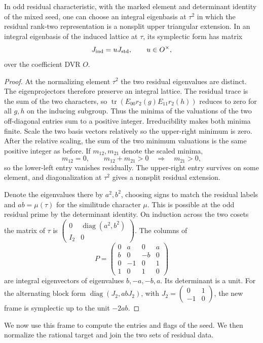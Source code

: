 \begin{lemma}
\label{lem:rank-four-seed-diagonalization}
In odd residual characteristic, with the marked element and
determinant identity of the mixed seed, one can choose an
integral eigenbasis at \(\tau^2\) in which the residual
rank-two representation is a nonsplit upper triangular
extension. In an integral eigenbasis of the induced lattice at \(\tau\), its symplectic form has matrix 
\[
 J_{\rm ind}=uJ_{\rm std},\qquad u\in O^\times,
\]
 over the coefficient DVR \(O\).
\end{lemma}

\begin{proof}
At the normalizing element
\(\tau^2\) the two residual eigenvalues are distinct.
The eigenprojectors therefore preserve an integral lattice.
The residual trace is the sum of the two characters, so
\(\operatorname{tr}(E_{00}r_2(g)E_{11}r_2(h))\) reduces to zero
for all \(g,h\) on the inducing subgroup. Thus the minima of the
valuations of the two off-diagonal entries sum to a positive
integer. Irreducibility makes both minima finite. Scale the
two basis vectors relatively so the upper-right minimum is
zero. After the relative scaling, the sum of the two minimum valuations is the same positive integer as before. If \(m_{12},m_{21}\) denote the scaled minima,
\[
 m_{12}=0,\qquad m_{12}+m_{21}>0\quad\Longrightarrow\quad m_{21}>0,
\]
so the lower-left entry vanishes residually. The
upper-right entry survives on some element, and diagonalization
at \(\tau^2\) gives a nonsplit residual extension.

Denote the
eigenvalues there by \(a^2,b^2\), choosing signs to match the
residual labels and \(ab=\mu(\tau)\) for the similitude
character \(\mu\). This is possible at the odd residual prime
by the determinant identity. On induction across the two cosets
the matrix of \(\tau\) is
\(\left(\begin{smallmatrix}0&\operatorname{diag}(a^2,b^2)\\
I_2&0\end{smallmatrix}\right)\). The columns of
\[
 P=\begin{pmatrix}0&a&0&a\\ b&0&-b&0\\0&-1&0&1\\1&0&1&0\end{pmatrix}
\]
are integral eigenvectors of eigenvalues \(b,-a,-b,a\).
Its determinant is a unit. For the alternating block form
\(\operatorname{diag}(J_2,abJ_2)\), with
\(J_2=\left(\begin{smallmatrix}0&1\\-1&0\end{smallmatrix}\right)\),
the new frame is symplectic up to the unit \(-2ab\).
\end{proof}

We now use this frame to compute the entries and flags of the
seed. We then normalize the rational target and join the two
sets of residual data.




\endgroup

